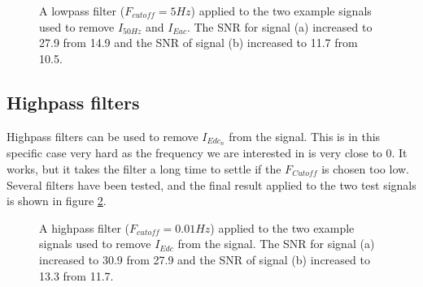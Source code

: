 \begin{figure}
	\centering     %
	\caption{A lowpass filter ($F_{cutoff} = 5Hz$) applied to the two example signals used to remove $I_{50Hz}$ and $I_{Eac}$. The SNR for signal (a) increased to 27.9 from 14.9 and the SNR of signal (b) increased to 11.7 from 10.5.\label{lowpass_example}}
\end{figure}

\subsection{Highpass filters}
Highpass filters can be used to remove $I_{Edc_{n}}$ from the signal. This is in this specific case very hard as the frequency we are interested in is very close to 0. It works, but it takes the filter a long time to settle if the $F_{Cutoff}$ is chosen too low. Several filters have been tested, and the final result applied to the two test signals is shown in figure \ref{higpass_example}.

\begin{figure}
	\centering     %
	\caption{A highpass filter ($F_{cutoff} = 0.01Hz$) applied to the two example signals used to remove $I_{Edc}$ from the signal. The SNR for signal (a) increased to 30.9 from 27.9 and the SNR of signal (b) increased to 13.3 from 11.7.\label{higpass_example}}
\end{figure}

